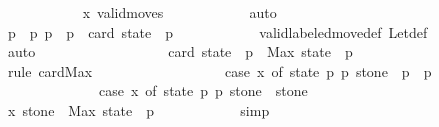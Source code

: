 \begin{isabellebody}
\ \ \ \ \ \ \ \ \ \ \isamarkupfalse%
\ x\ valid{\isacharunderscore}moves{\isacharprime}\isanewline
\ \ \ \ \ \ \ \ \ \ \isamarkupfalse%
\ auto\isanewline
\ \ \ \ \ \ \ \ \isamarkupfalse%
\ \isamarkupfalse%
\ {\isachardoublequoteopen}p{}\ {\isacharless}\ p{}{\isachardoublequoteclose}\ {\isachardoublequoteopen}p{}\ {\isasymle}\ p{}\ {\isacharplus}\ card\ {\isacharparenleft}state\ {\isacharbang}\ p{}{\isacharparenright}{\isachardoublequoteclose}\isanewline
\ \ \ \ \ \ \ \ \ \ \isamarkupfalse%
\ valid{\isacharunderscore}labeled{\isacharunderscore}move{\isacharprime}{\isacharunderscore}def\ Let{\isacharunderscore}def\isanewline
\ \ \ \ \ \ \ \ \ \ \isamarkupfalse%
\ auto\isanewline
\isanewline
\ \ \ \ \ \ \ \ \isamarkupfalse%
\isanewline
\isanewline
\ \ \ \ \ \ \ \ \isamarkupfalse%
\ {\isachardoublequoteopen}card\ {\isacharparenleft}state\ {\isacharbang}\ p{}{\isacharparenright}\ {\isasymle}\ Max\ {\isacharparenleft}state\ {\isacharbang}\ p{}{\isacharparenright}\ {\isacharplus}\ {}{\isachardoublequoteclose}\isanewline
\ \ \ \ \ \ \ \ \ \ \isamarkupfalse%
\ {\isacharparenleft}rule\ card{\isacharunderscore}Max{\isacharparenright}\isanewline
\isanewline
\ \ \ \ \ \ \ \ \isamarkupfalse%
\isanewline
\isanewline
\ \ \ \ \ \ \ \ \isamarkupfalse%
\ {\isachardoublequoteopen}{\isacharparenleft}case\ x\ of\ {\isacharparenleft}state{\isacharcomma}\ p{}{\isacharcomma}\ p{}{\isacharcomma}\ stone{\isacharparenright}\ {\isasymRightarrow}\ p{}\ {\isacharminus}\ p{}{\isacharparenright}\ {\isasymle}\ \isanewline
\ \ \ \ \ \ \ \ \ \ \ \ \ \ {\isacharparenleft}case\ x\ of\ {\isacharparenleft}state{\isacharcomma}\ p{}{\isacharcomma}\ p{}{\isacharcomma}\ stone{\isacharparenright}\ {\isasymRightarrow}\ stone\ {\isacharplus}\ {}{\isacharparenright}{\isachardoublequoteclose}\isanewline
\ \ \ \ \ \ \ \ \ \ \isamarkupfalse%
\ x\ {\isacharbackquoteopen}stone{\isacharprime}\ {\isacharequal}\ Max\ {\isacharparenleft}state\ {\isacharbang}\ p{}{\isacharparenright}{\isacharbackquoteclose}\isanewline
\ \ \ \ \ \ \ \ \ \ \isamarkupfalse%
\ simp\isanewline
\ \ \ \ \ \ \isamarkupfalse%
\isanewline
\ \ \ \ \ \ \isamarkupfalse%
\ \isamarkupfalse%

\end{isabellebody}
